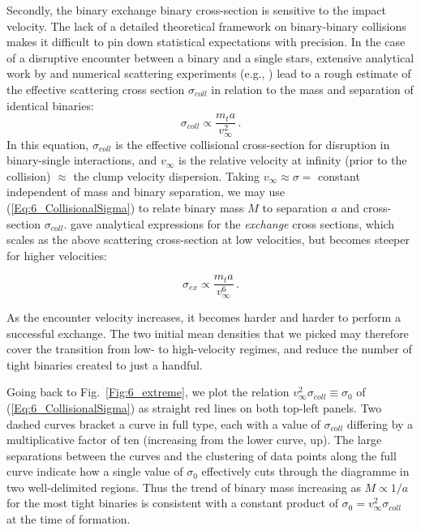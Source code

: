 Secondly, the binary exchange binary cross-section is sensitive to the impact velocity. The lack of a detailed theoretical framework on binary-binary collisions makes it difficult to pin down statistical expectations with precision. In the case of a disruptive encounter between a binary and a single stars, extensive 
analytical work by \cite{Mikkola1983,Mikkola1984a,Mikkola1984b} and numerical scattering experiments (e.g., \citealt{Heggie1996,Fregeau2004}) lead to a rough estimate of the effective scattering cross section $\sigma_{coll}$ in relation to the mass and separation of identical binaries: 
\begin{equation}
\sigma_{coll} \propto \frac{m_t a}{v_\infty^2}\, . 
\label{Eq:6_CollisionalSigma} 
\end{equation}
In this equation, $\sigma_{coll}$ is the effective collisional cross-section for disruption in binary-single  interactions, and $v_\infty$ is the relative velocity at infinity (prior to the collision) $\approx $ the clump velocity dispersion. Taking $ v_\infty \approx \sigma = $ constant independent of mass and binary separation, we may use (\ref{Eq:6_CollisionalSigma}) to relate binary mass $M$ to separation $a$ and  cross-section $\sigma_{coll}$. \cite{Hut1983,Hut1983b} gave analytical expressions for the \textit{exchange} cross sections, which scales as the above scattering cross-section at low velocities, but becomes steeper for higher velocities:

\begin{equation}
\sigma_{ex} \propto \frac{m_t a}{v_\infty^6}\, . 
\label{Eq:6_ExchangeSigma} 
\end{equation}
  
As the encounter velocity increases, it becomes harder and harder to perform a successful exchange. The two initial mean 
densities that we picked may therefore cover the transition from low- to high-velocity regimes, and reduce the number of tight binaries created to just a handful. 

Going back to Fig.~\ref{Fig:6_extreme}, we plot the relation $v^2_\infty \sigma_{coll} \equiv \sigma_0$ of (\ref{Eq:6_CollisionalSigma}) as straight red lines on both top-left panels. Two dashed curves bracket a curve in full type, each with a value of  $\sigma_{coll}$ differing by a multiplicative factor of ten (increasing from the lower curve, up).  The large separations between the curves and the clustering of data points along the full curve indicate how a single value of $\sigma_0$ effectively cuts through the diagramme in two well-delimited regions.  
Thus the trend of binary mass increasing as $M \propto 1/a$ for the most tight binaries is consistent with a constant product of $\sigma_0 = v^2_\infty \sigma_{coll}$ at the time of formation. 

